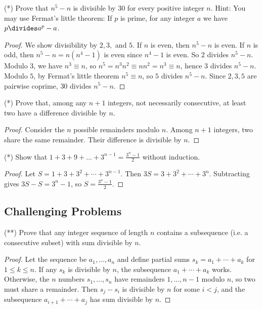 \documentclass[12pt]{article}
\begin{document}
\begin{problem}
(*) Prove that $n^5 - n$ is divisible by $30$ for every positive integer $n$. Hint: You may use Fermat's little theorem: If $p$ is prime, for any integer $a$ we have $p \divides a^p - a$.
\begin{proof}
We show divisibility by $2,3,$ and $5$. If $n$ is even, then $n^5-n$ is even. If $n$ is odd, then $n^5-n=n(n^4-1)$ is even since $n^4-1$ is even. So $2$ divides $n^5-n$. Modulo $3$, we have $n^3\equiv n$, so $n^5=n^3 n^2\equiv n n^2=n^3\equiv n$, hence $3$ divides $n^5-n$. Modulo $5$, by Fermat's little theorem $n^5\equiv n$, so $5$ divides $n^5-n$. Since $2,3,5$ are pairwise coprime, $30$ divides $n^5-n$.
\end{proof}
\end{problem}

\begin{problem}
(*) Prove that, among any $n+1$ integers, not necessarily consecutive, at least two have a difference divisible by $n$.
\begin{proof}
Consider the $n$ possible remainders modulo $n$. Among $n+1$ integers, two share the same remainder. Their difference is divisible by $n$.
\end{proof}
\end{problem}

\begin{problem}
(*) Show that $1 + 3 + 9 + \ldots + 3^{n-1} = \frac{3^n - 1}{2}$ without induction.
\begin{proof}
Let $S=1+3+3^2+\cdots+3^{n-1}$. Then $3S=3+3^2+\cdots+3^n$. Subtracting gives $3S-S=3^n-1$, so $S=\frac{3^n-1}{2}$.
\end{proof}
\end{problem}

\subsection*{Challenging Problems}

\begin{problem}
(**) Prove that any integer sequence of length $n$ contains a subsequence (i.e. a consecutive subset) with sum divisible by $n$.
\begin{proof}
Let the sequence be $a_1,\ldots,a_n$ and define partial sums $s_k=a_1+\cdots+a_k$ for $1\le k\le n$. If any $s_k$ is divisible by $n$, the subsequence $a_1+\cdots+a_k$ works. Otherwise, the $n$ numbers $s_1,\ldots,s_n$ have remainders $1,\ldots,n-1$ modulo $n$, so two must share a remainder. Then $s_j-s_i$ is divisible by $n$ for some $i<j$, and the subsequence $a_{i+1}+\cdots+a_j$ has sum divisible by $n$.
\end{proof}
\end{problem}
\end{document}
